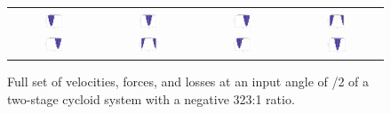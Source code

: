 \begin{figure}[h]
\begin{tabular}{cccc}
	   \\
	   \hline
	   \\
	   \includegraphics[width=0.23\textwidth]{fig/double_1_neg_losses_0} &
	   \includegraphics[width=0.23\textwidth]{fig/double_1_neg_losses_pi_2} &
	   \includegraphics[width=0.23\textwidth]{fig/double_1_neg_losses_pi} &
	   \includegraphics[width=0.23\textwidth]{fig/double_1_neg_losses_3pi_2} \\
	   \includegraphics[width=0.23\textwidth]{fig/double_2_neg_losses_0} &
	   \includegraphics[width=0.23\textwidth]{fig/double_2_neg_losses_pi_2} &
	   \includegraphics[width=0.23\textwidth]{fig/double_2_neg_losses_pi} &
	   \includegraphics[width=0.25\textwidth]{fig/double_2_neg_losses_3pi_2} \\
   \end{tabular}
   \caption{Full set of velocities, forces, and losses at an input angle of \textpi/2 of a two-stage cycloid system with a negative 323:1 ratio.}
   \label{fig:two_stage_forces_neg}
\end{figure}